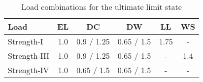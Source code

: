 \begin{table}[H]
\caption{Load combinations for the ultimate limit state}
\label{tab:uls_combination}
\centering
\begin{tabular}{lccccc}
\hline
Load         & EL  & DC         & DW         & LL   & WS  \\ \hline
Strength-I   & 1.0 & 0.9 / 1.25 & 0.65 / 1.5 & 1.75 & -   \\
Strength-III & 1.0 & 0.9 / 1.25 & 0.65 / 1.5 & -    & 1.4 \\ 
Strength-IV  & 1.0 & 0.65 / 1.5 & 0.65 / 1.5 & -    & - \\ \hline
\end{tabular}
\end{table}
